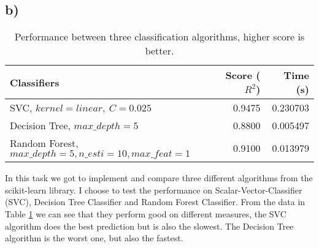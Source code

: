 \documentclass{article}
\begin{document}
      \subsection{b)}
        \begin{table}[h]
          \centering
          \label{tbl:task1b}
          \begin{tabular}{lrr}
            \toprule
            {Classifiers} &   Score ($R^2$)&  Time (s) \\
            \midrule
            SVC, $kernel=linear,~C=0.025$ &  0.9475 &  0.230703 \\
            Decision Tree, $max\_depth=5$ &  0.8800 &  0.005497 \\
            Random Forest, $max\_depth=5, n\_esti=10, max\_feat=1$ &  0.9100 &  0.013979 \\
            \bottomrule
          \end{tabular}
          \caption{Performance between three classification algorithms, higher score is better.}
        \end{table}
        In this task we got to implement and compare three different algorithms from the scikit-learn 
        library. I choose to test the performance on Scalar-Vector-Classifier (SVC), Decision Tree Classifier and
        Random Forest Classifier.
        From the data in Table \ref{tbl:task1b} we can see that they perform good on different measures, the SVC algorithm 
        does the best prediction but is also the slowest. The Decision Tree algorithm is the worst one, but also the fastest.
        
\end{document}
